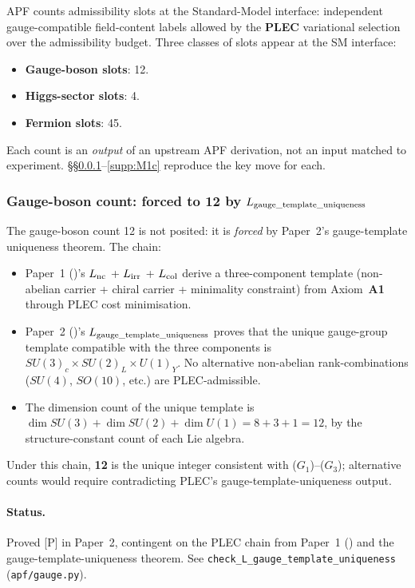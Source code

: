 \documentclass[11pt]{article}
\theoremstyle{plain}
\theoremstyle{definition}
\theoremstyle{remark}
\newcommand{\Aone}{\textbf{A1}}
\newcommand{\PLEC}{\textbf{PLEC}}
\newcommand{\paperref}[2]{Paper~#1 (\emph{#2})}
\begin{document}
APF counts admissibility slots at the Standard-Model interface: independent gauge-compatible field-content labels allowed by the \PLEC{} variational selection over the admissibility budget.  Three classes of slots appear at the SM interface:

\begin{itemize}[leftmargin=2em,itemsep=4pt]
  \item \textbf{Gauge-boson slots}: 12.
  \item \textbf{Higgs-sector slots}: 4.
  \item \textbf{Fermion slots}: 45.
\end{itemize}

Each count is an \emph{output} of an upstream APF derivation, not an input matched to experiment.  \S\S\ref{supp:M1a}--\ref{supp:M1c} reproduce the key move for each.

\subsubsection{Gauge-boson count: forced to 12 by $L_{\rm gauge\_template\_uniqueness}$}\label{supp:M1a}

The gauge-boson count 12 is not posited: it is \emph{forced} by Paper~2's gauge-template uniqueness theorem.  The chain:
\begin{itemize}[leftmargin=2em,itemsep=3pt]
  \item[($G_1$)] \paperref{1}{}'s $L_{\rm nc}$ + $L_{\rm irr}$ + $L_{\rm col}$ derive a three-component template (non-abelian carrier + chiral carrier + minimality constraint) from Axiom~\Aone{} through PLEC cost minimisation.
  \item[($G_2$)] \paperref{2}{}'s $L_{\rm gauge\_template\_uniqueness}$ proves that the unique gauge-group template compatible with the three components is $SU(3)_c \times SU(2)_L \times U(1)_Y$.  No alternative non-abelian rank-combinations ($SU(4)$, $SO(10)$, etc.) are PLEC-admissible.
  \item[($G_3$)] The dimension count of the unique template is $\dim SU(3) + \dim SU(2) + \dim U(1) = 8 + 3 + 1 = 12$, by the structure-constant count of each Lie algebra.
\end{itemize}
Under this chain, \textbf{12} is the unique integer consistent with (${G_1}$)--(${G_3}$); alternative counts would require contradicting PLEC's gauge-template-uniqueness output.

\paragraph{Status.}  Proved [P] in Paper~2, contingent on the PLEC chain from \paperref{1}{} and the gauge-template-uniqueness theorem.  See \texttt{check\_L\_gauge\_template\_uniqueness} (\texttt{apf/gauge.py}).
\end{document}
